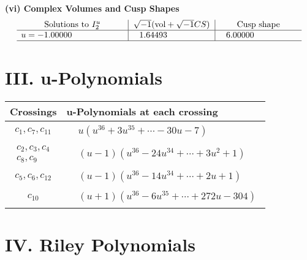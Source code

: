 \documentclass[1p]{elsarticle_modified}
\theoremstyle{definition}
\newcommand{\I}{\sqrt{-1}}
\begin{document}
\newpage\flushleft \textbf{(vi) Complex Volumes and Cusp Shapes}
$$\begin{array}{c|c|c}  
\text{Solutions to }I^u_{2}& \I (\text{vol} + \sqrt{-1}CS) & \text{Cusp shape}\\
 \hline 
\begin{aligned}
u &= -1.00000\phantom{ +0.000000I}\end{aligned}
 & \phantom{-}1.64493\phantom{ +0.000000I} & \phantom{-}6.00000\phantom{ +0.000000I}\\
 \hline 
 \end{array}$$\newpage
\newpage\renewcommand{\arraystretch}{1}
\centering \section*{ III. u-Polynomials}
\begin{tabular}{m{50pt}|m{274pt}}
Crossings & \hspace{64pt}u-Polynomials at each crossing \\
\hline $$\begin{aligned}c_{1},c_{7},c_{11}\end{aligned}$$&$\begin{aligned}
&u(u^{36}+3 u^{35}+\cdots-30 u-7)
\end{aligned}$\\
\hline $$\begin{aligned}c_{2},c_{3},c_{4}\\c_{8},c_{9}\end{aligned}$$&$\begin{aligned}
&(u-1)(u^{36}-24 u^{34}+\cdots+3 u^2+1)
\end{aligned}$\\
\hline $$\begin{aligned}c_{5},c_{6},c_{12}\end{aligned}$$&$\begin{aligned}
&(u-1)(u^{36}-14 u^{34}+\cdots+2 u+1)
\end{aligned}$\\
\hline $$\begin{aligned}c_{10}\end{aligned}$$&$\begin{aligned}
&(u+1)(u^{36}-6 u^{35}+\cdots+272 u-304)
\end{aligned}$\\
\hline
\end{tabular}\newpage\renewcommand{\arraystretch}{1}
\centering \section*{ IV. Riley Polynomials}
\end{document}
